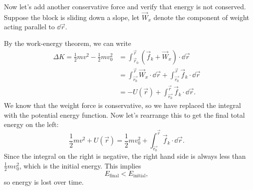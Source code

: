 \documentclass[../classical_mechanics.tex]{subfiles}
\begin{document}
        Now let's add another conservative force and verify that energy is not conserved.
        Suppose the block is sliding down a slope, let $\vec{W}_x$ denote the component of weight acting parallel to $\dd{\vec{r}}$.
        \begin{figure}[H]
            \centering
        \end{figure}
        By the work-energy theorem, we can write
        \begin{align}
            \Delta K=\frac{1}{2}mv^2-\frac{1}{2}mv_0^2&=\int_{\vec{r}_0}^{\vec{r}}(\vec{f}_k+\vec{W}_x)\cdot\dd{\vec{r}}\\
            &=\int_{\vec{r_0}}^{\vec{r}}\vec{W}_x\cdot\dd{\vec{r}}+\int_{\vec{r_0}}^{\vec{r}}\vec{f}_k\cdot\dd{\vec{r}}\\
            &=-U(\vec{r})+\int_{\vec{r_0}}^{\vec{r}}\vec{f}_k\cdot\dd{\vec{r}}.
        \end{align}
        We know that the weight force is conservative, so we have replaced the integral with the potential energy function.
        Now let's rearrange this to get the final total energy on the left:
        \begin{equation}
            \frac{1}{2}mv^2+U(\vec{r})=\frac{1}{2}mv_0^2+\int_{\vec{r_0}}^{\vec{r}}\vec{f}_k\cdot\dd{\vec{r}}.
        \end{equation}
        Since the integral on the right is negative, the right hand side is always less than $\frac{1}{2}mv_0^2$, which is the initial energy.
        This implies
        \begin{equation}
            E_\text{final}<E_\text{initial},
        \end{equation}
        so energy is lost over time.
\end{document}

